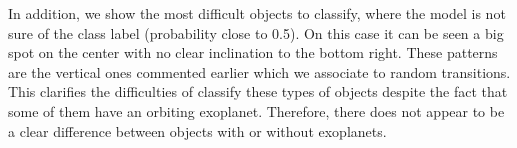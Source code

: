 In addition, we show the most difficult objects to classify, where the model is not sure of the class label (probability close to 0.5).
On this case it can be seen a big spot on the center with no clear inclination to the bottom right. These patterns are the vertical ones commented earlier which we associate to random transitions. 
This clarifies the difficulties of classify these types of objects despite the fact that some of them have an orbiting exoplanet. Therefore, there does not appear to be a clear difference between objects with or without exoplanets.